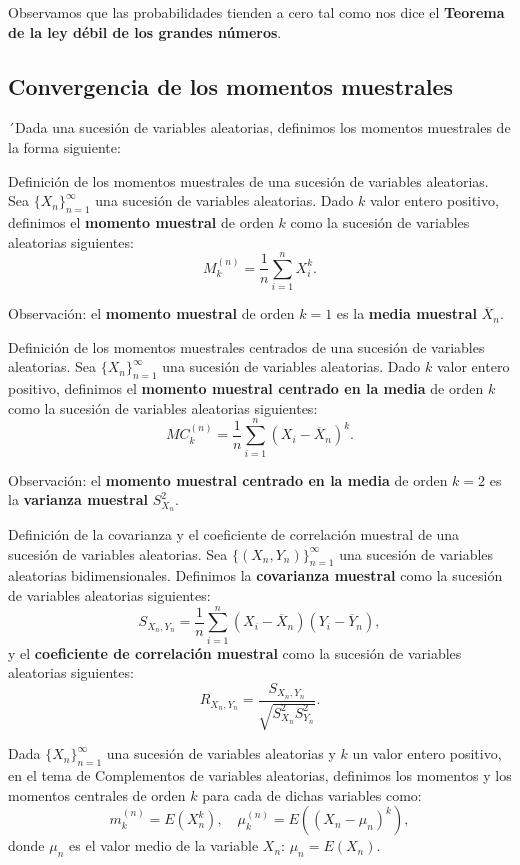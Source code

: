 \documentclass[
  letterpaper,
  DIV=11,
  numbers=noendperiod]{scrreprt}
\begin{document}
Observamos que las probabilidades tienden a cero tal como nos dice el
\textbf{Teorema de la ley débil de los grandes números}.

\hypertarget{convergencia-de-los-momentos-muestrales}{%
\subsection{Convergencia de los momentos
muestrales}\label{convergencia-de-los-momentos-muestrales}}

´Dada una sucesión de variables aleatorias, definimos los momentos
muestrales de la forma siguiente:

Definición de los momentos muestrales de una sucesión de variables
aleatorias. Sea \(\{X_n\}_{n=1}^\infty\) una sucesión de variables
aleatorias. Dado \(k\) valor entero positivo, definimos el
\textbf{momento muestral} de orden \(k\) como la sucesión de variables
aleatorias siguientes: \[
M_k^{(n)} = \frac{1}{n}\sum_{i=1}^n X_i^k.
\]

Observación: el \textbf{momento muestral} de orden \(k=1\) es la
\textbf{media muestral} \(\overline{X}_n\).

Definición de los momentos muestrales centrados de una sucesión de
variables aleatorias. Sea \(\{X_n\}_{n=1}^\infty\) una sucesión de
variables aleatorias. Dado \(k\) valor entero positivo, definimos el
\textbf{momento muestral centrado en la media} de orden \(k\) como la
sucesión de variables aleatorias siguientes: \[
MC_k^{(n)} = \frac{1}{n}\sum_{i=1}^n (X_i-\overline{X}_n)^k.
\]

Observación: el \textbf{momento muestral centrado en la media} de orden
\(k=2\) es la \textbf{varianza muestral} \(S_{X_n}^2\).

Definición de la covarianza y el coeficiente de correlación muestral de
una sucesión de variables aleatorias. Sea \(\{(X_n,Y_n)\}_{n=1}^\infty\)
una sucesión de variables aleatorias bidimensionales. Definimos la
\textbf{covarianza muestral} como la sucesión de variables aleatorias
siguientes: \[
S_{X_n,Y_n} = \frac{1}{n}\sum_{i=1}^n (X_i-\overline{X}_n)(Y_i-\overline{Y}_n),
\] y el \textbf{coeficiente de correlación muestral} como la sucesión de
variables aleatorias siguientes: \[
R_{X_n,Y_n}=\frac{S_{X_n,Y_n}}{\sqrt{S_{X_n}^2 S_{Y_n}^2}}.
\]

Dada \(\{X_n\}_{n=1}^\infty\) una sucesión de variables aleatorias y
\(k\) un valor entero positivo, en el tema de Complementos de variables
aleatorias, definimos los momentos y los momentos centrales de orden
\(k\) para cada de dichas variables como: \[
m_k^{(n)} = E\left(X_n^k\right),\quad\mu_k^{(n)}=E\left(\left(X_n-\mu_n\right)^k\right),
\] donde \(\mu_n\) es el valor medio de la variable \(X_n\):
\(\mu_n = E(X_n)\).
\end{document}
